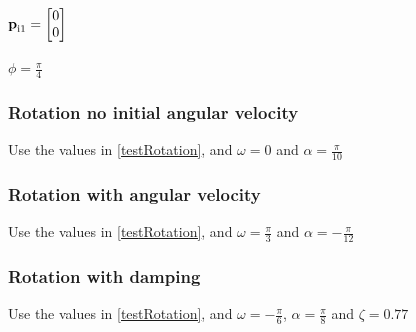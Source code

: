 \documentclass[12pt]{article}
\begin{document}
$ \textbf p_\text{i1} = \begin{bmatrix}
	0\\
	0\\
	\end{bmatrix}$\\
\noindent\\

$\phi = \frac{\pi}{4}$

\subsubsection{Rotation no initial angular velocity} \label{testRotation1}
Use the values in \ref{testRotation}, and $\omega = 0 $ and  $ \alpha = \frac{\pi}{10} $

\subsubsection{Rotation with angular velocity} \label{testRotation2}
Use the values in \ref{testRotation}, and $\omega = \frac{\pi}{3} $ and  $ \alpha = -\frac{\pi}{12} $

\subsubsection{Rotation with damping} \label{testRotation3}
Use the values in \ref{testRotation}, and $\omega = -\frac{\pi}{6} $,  $ \alpha = \frac{\pi}{8}$ and $\zeta = 0.77 $
\end{document}
